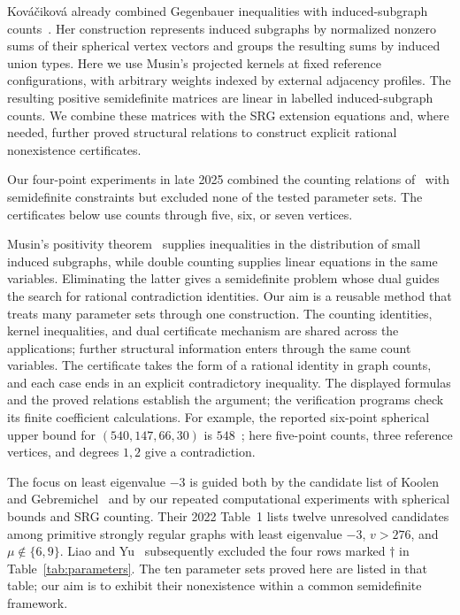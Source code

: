 \documentclass[11pt]{article}
\theoremstyle{remark}
\numberwithin{equation}{section}
\begin{document}
Kov\'a\v{c}ikov\'a already combined Gegenbauer inequalities with
induced-subgraph counts~\cite[Proposition~4.2, Lemma~4.2, and
Sections~4.2--4.3]{kovacikova}. Her construction represents induced
subgraphs by normalized nonzero sums of their spherical vertex vectors and
groups the resulting sums by induced union types. Here we use Musin's
projected kernels at fixed reference configurations, with arbitrary
weights indexed by external adjacency profiles. The resulting positive
semidefinite matrices are linear in labelled induced-subgraph counts.
We combine these matrices with the SRG extension equations and, where
needed, further proved structural relations to construct explicit
rational nonexistence certificates.

Our four-point experiments in late 2025 combined the counting relations
of~\cite[Proposition~3.2 and Section~3.3.3]{kovacikova} with semidefinite
constraints but excluded none of the tested parameter sets. The
certificates below use counts through five, six, or seven vertices.

Musin's positivity theorem~\cite{musin} supplies inequalities in the
distribution of small induced subgraphs, while double counting supplies
linear equations in the same variables. Eliminating the latter gives
a semidefinite problem whose dual guides the search for rational
contradiction identities.
Our aim is a reusable method that treats many parameter sets through
one construction. The counting identities, kernel inequalities, and
dual certificate mechanism are shared across the applications; further
structural information enters through the same count variables.
The certificate takes the form of a rational identity in graph counts,
and each case ends in an explicit contradictory inequality. The
displayed formulas and the proved relations establish the argument;
the verification programs check its finite coefficient calculations.
For example, the reported six-point spherical upper bound for
$(540,147,66,30)$ is $548$~\cite[Table~3]{LY}; here five-point counts,
three reference vertices, and degrees $1,2$ give a contradiction.

The focus on least eigenvalue $-3$ is guided both by the candidate list
of Koolen and Gebremichel~\cite[Table~1]{KG} and by our repeated computational
experiments with spherical bounds and SRG counting. Their 2022
Table~1 lists twelve unresolved candidates among primitive strongly
regular graphs with least eigenvalue $-3$, $v>276$, and
$\mu\notin\{6,9\}$. Liao and Yu~\cite[Theorem~1]{LY} subsequently
excluded the four rows marked $\dagger$ in Table~\ref{tab:parameters}.
The ten parameter sets proved here are listed in that table; our aim is
to exhibit their nonexistence within a common semidefinite framework.
\end{document}

